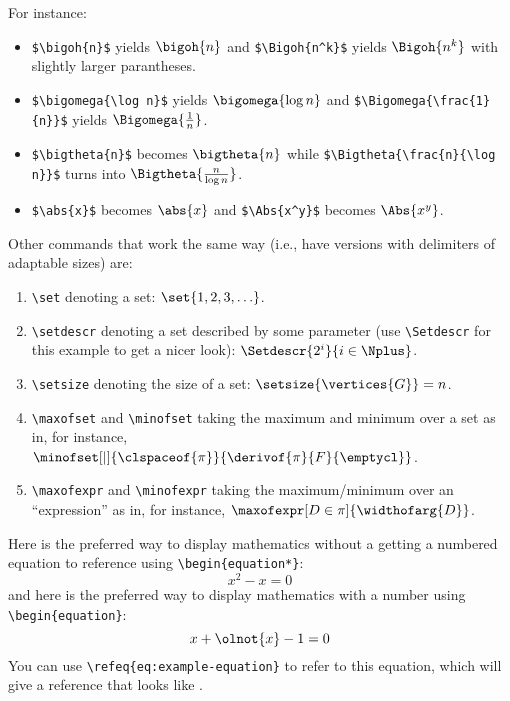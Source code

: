 For instance:
\begin{itemize}
\item 
\verb+$\bigoh{n}$+ 
yields
$\bigoh{n}$
and
\verb+$\Bigoh{n^k}$+
yields
$\Bigoh{n^k}$
with slightly larger parantheses.
\item 
\verb+$\bigomega{\log n}$+ 
yields
$\bigomega{\log n}$
and
\verb+$\Bigomega{\frac{1}{n}}$+
yields
$\Bigomega{\frac{1}{n}}$.

\item
  \verb+$\bigtheta{n}$+ becomes
  $\bigtheta{n}$
  while
  \verb+$\Bigtheta{\frac{n}{\log n}}$+
  turns into
  $\Bigtheta{\frac{n}{\log n}}$.
  
\item
  \verb+$\abs{x}$+ 
  becomes
  $\abs{x}$
  and
  \verb+$\Abs{x^y}$+
  becomes
  $\Abs{x^y}$.
\end{itemize}

Other commands that work the same way (i.e., have
versions with delimiters of adaptable sizes) are:
\begin{enumerate}
\item 
  \verb+\set+ denoting a set:
  $\set{1,2,3,\ldots}$.
\item 
  \verb+\setdescr+
  denoting a set described by some parameter
  (use
  \verb+\Setdescr+
  for this example 
  to get a nicer look):
  $\Setdescr{2^i}{i \in \Nplus}$.
\item 
  \verb+\setsize+
  denoting the size of a set:
  $\setsize{\vertices{G}} = n$.
\item 
  \verb+\maxofset+ 
  and
  \verb+\minofset+ 
  taking the maximum and minimum over a set as in, for instance, 
  $\minofset[\mid]{\clspaceof{\pi}}{\derivof{\pi}{F}{\emptycl}}$.
\item 
  \verb+\maxofexpr+
  and
  \verb+\minofexpr+
  taking the maximum/minimum over an ``expression'' as in, for instance,
  $\maxofexpr[D \in \pi]{\widthofarg{D}}$.
\end{enumerate}

Here is the preferred way to display mathematics without a getting a
numbered equation to reference
using
\verb+\begin{equation*}+:
\begin{equation*}
  x^2 - x = 0
\end{equation*}
and
here is the preferred way to display mathematics with a number
using
\verb+\begin{equation}+:
\begin{equation}
  \label{eq:example-equation}
  x + \olnot{x} - 1 = 0
\end{equation}
You can use
\verb+\refeq{eq:example-equation}+
to refer to this equation, which will give a reference that looks like
.


